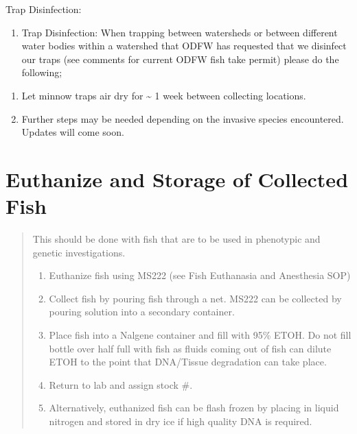 \documentclass[
]{book}
\providecommand{\tightlist}{%
  \setlength{\itemsep}{0pt}\setlength{\parskip}{0pt}}
\begin{document}
Trap Disinfection:

\begin{enumerate}
\def\labelenumi{\arabic{enumi}.}
\setcounter{enumi}{7}
\tightlist
\item
  Trap Disinfection: When trapping between watersheds or between different water bodies within a watershed that ODFW has requested that we disinfect our traps (see comments for current ODFW fish take permit) please do the following;
\end{enumerate}

\begin{enumerate}
\def\labelenumi{\alph{enumi}.}
\tightlist
\item
  Let minnow traps air dry for \textasciitilde{} 1 week between collecting locations.
\item
  Further steps may be needed depending on the invasive species encountered. Updates will come soon.
\end{enumerate}

\hypertarget{euthanize-and-storage-of-collected-fish}{%
\section{Euthanize and Storage of Collected Fish}\label{euthanize-and-storage-of-collected-fish}}

\begin{quote}
This should be done with fish that are to be used in phenotypic and genetic investigations.

\begin{enumerate}
\def\labelenumi{\arabic{enumi}.}
\tightlist
\item
  Euthanize fish using MS222 (see Fish Euthanasia and Anesthesia SOP)
\item
  Collect fish by pouring fish through a net. MS222 can be collected by pouring solution into a secondary container.
\item
  Place fish into a Nalgene container and fill with 95\% ETOH. Do not fill bottle over half full with fish as fluids coming out of fish can dilute ETOH to the point that DNA/Tissue degradation can take place.
\item
  Return to lab and assign stock \#.
\item
  Alternatively, euthanized fish can be flash frozen by placing in liquid nitrogen and stored in dry ice if high quality DNA is required.
\end{enumerate}
\end{quote}
\end{document}
